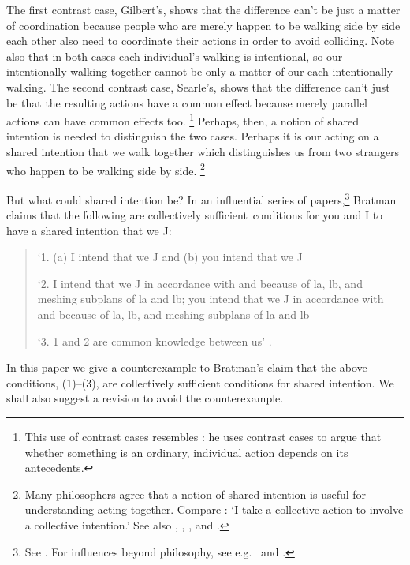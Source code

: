 \documentclass[12pt,\papersize]{extarticle}
\begin{document}
The first contrast case, Gilbert's, shows that the difference can’t be just  a matter of coordination because people who are merely happen to be walking side by side each other also need to coordinate their actions in order to avoid colliding.  
Note also that in both cases each individual's walking is intentional, so our intentionally walking together cannot be  only a matter of our each intentionally walking.
The second contrast case, Searle's, shows that the difference can’t just be that the resulting actions have a common effect because merely parallel actions can have common effects too.%
\footnote{
This use of contrast cases resembles \citet{Pears:1971fk}: he uses contrast cases to argue that whether something is an ordinary, individual action depends on its antecedents. 
} 
Perhaps, then, a notion of shared intention is needed to distinguish the two cases.  
Perhaps it is our acting on a shared intention that we walk together which distinguishes us from two strangers who happen to be walking side by side.%
\footnote{
Many philosophers agree that a notion of shared intention is useful for understanding acting together. 
Compare \citet[p.\ 5]{Gilbert:2006wr}: `I take a collective action to involve a collective intention.'  See also  
	\citet[p.\ 381]{Carpenter:2009wq}, 
	\citet[p.\ 369]{Call:2009fk}, 
	\citet{Kutz:2000si}, 
	\citet[p.\ 117]{rakoczy_pretend_2006} and 
	\citet{Tollefsen:2005vh}.
	}
	

But what could shared intention be?
In an influential series of papers,\footnote{ 
See \citet{Bratman:1992mi,Bratman:1993je,Bratman:1999fr,Bratman:2009lv}.
For influences beyond philosophy, see e.g.\ \citet{Tomasello:2005wx} and \citet{Knoblich:2008hy}. 
}
Bratman claims that the following are collectively sufficient\footnotemark \ conditions for you and I to have a shared intention that we J:
%
%
\begin{quote}
\label{quote:bratman_account}
`1. (a) I intend that we J and (b) you intend that we J
 
`2. I intend that we J in accordance with and because of la, lb, and meshing subplans of la and lb; you intend that we J in accordance with and because of la, lb, and meshing subplans of la and lb
 
`3. 1 and 2 are common knowledge between us' \citep[][p.\ View 4]{Bratman:1993je}.
\end{quote}
%
In this paper we give a counterexample to Bratman's  claim that the above conditions, (1)--(3), are collectively sufficient conditions for shared intention. 
We shall also suggest a revision to avoid the counterexample.
\end{document}
